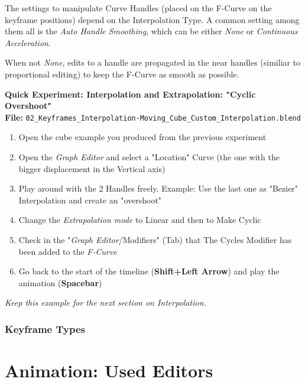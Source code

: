 \documentclass{article}
\begin{document}
The settings to manipulate Curve Handles (placed on the F-Curve on the keyframe positions) depend on the Interpolation Type. A common setting among them all is the
\textit{Auto Handle Smoothing}, which can be either \textit{None} or \textit{Continuous Acceleration}.\par
When not \textit{None}, edits to a handle are propagated in the near handles (similiar to proportional editing) to keep the F-Curve as smooth as possible.
\begin{mdframed}[linewidth=2pt, linecolor=gray, roundcorner=1pt, innermargin=2pt, outermargin=2pt]
    \textbf{\Large Quick Experiment: Interpolation and Extrapolation: "Cyclic Overshoot"} \\[6pt]
    \textbf{File:} \texttt{02\_Keyframes\_Interpolation-Moving\_Cube\_Custom\_Interpolation.blend} \\[6pt]

    \begin{enumerate}[topsep=0pt, noitemsep]
        \item Open the cube example you produced from the previous experiment
        \item Open the \textit{Graph Editor} and select a "Location" Curve (the one with the bigger displacement in the Vertical axis)
        \item Play around with the 2 Handles freely. Example: Use the last one as "Bezier" Interpolation and create an "overshoot"
        \item Change the \textit{Extrapolation mode} to Linear and then to Make Cyclic
        \item Check in the "\textit{Graph Editor}/Modifiers" (Tab) that The Cycles Modifier has been added to the \textit{F-Curve}
        \item Go back to the start of the timeline (\textbf{Shift+Left Arrow}) and play the animation (\textbf{Spacebar})
    \end{enumerate}

    \textit{Keep this example for the next section on Interpolation.}
\end{mdframed}

\subsubsection{Keyframe Types}

\section{Animation: Used Editors}
\end{document}

